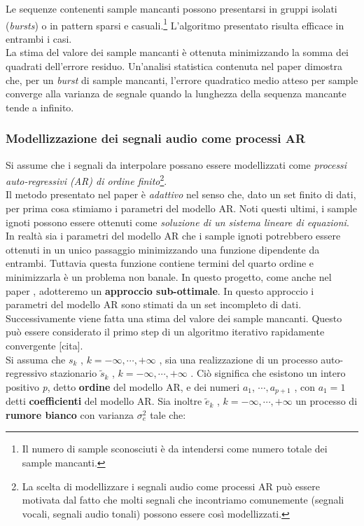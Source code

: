 \documentclass{article}
\begin{document}
Le sequenze contenenti sample mancanti possono presentarsi in gruppi isolati (\textit{bursts}) o in pattern sparsi e casuali.\footnote{Il numero di sample sconosciuti è da intendersi come numero totale dei sample mancanti. } 
L'algoritmo presentato risulta efficace in entrambi i casi.
\medskip 
\\
La stima del valore dei sample mancanti è ottenuta minimizzando la somma dei quadrati dell'errore residuo. 
Un'analisi statistica contenuta nel paper \cite[Section II.B]{paper_1986} dimostra che, per un \textit{burst} di sample mancanti, l'errore quadratico medio atteso per sample converge alla varianza de segnale quando la lunghezza della sequenza mancante tende a infinito. 
\subsubsection{Modellizzazione dei segnali audio come processi AR}  
Si assume che i segnali da interpolare possano essere modellizzati come \emph{processi auto-regressivi (AR) di ordine finito}\footnote{La scelta di modellizzare i segnali audio come processi AR può essere motivata dal fatto che molti segnali che incontriamo comunemente (segnali vocali, segnali audio tonali) possono essere così modellizzati.}.
\\
Il metodo presentato nel paper \cite{paper_1986} è \emph{adattivo} nel senso che, dato un set finito di dati, per prima cosa stimiamo i parametri del modello AR. Noti questi ultimi, i sample ignoti possono essere ottenuti come \textit{soluzione di un sistema lineare di equazioni}.
\\
In realtà sia i parametri del modello AR che i sample ignoti potrebbero essere ottenuti in un unico passaggio minimizzando una funzione dipendente da entrambi. Tuttavia questa funzione contiene termini del quarto ordine e minimizzarla è un problema non banale. In questo progetto, come anche nel paper \cite{paper_1986}, adotteremo un \textbf{approccio sub-ottimale}. In questo approccio i parametri del modello AR sono stimati da un set incompleto di dati. Successivamente viene fatta una stima del valore dei sample mancanti. Questo può essere considerato il primo step di un algoritmo iterativo rapidamente convergente [cita].
\medskip 
\\
Si assuma che $s_{k}$ , $k =  -\infty , \cdots , +\infty$ , sia una realizzazione di un processo auto-regressivo stazionario $\tilde{s}_{k}$ , $k =  -\infty , \cdots , +\infty$ . Ciò significa che esistono un intero positivo \emph{p}, detto \textbf{ordine} del modello AR, e dei numeri $a_{1}$, $\cdots , a_{p+1}$ , con $a_{1}=1$ detti \textbf{coefficienti} del modello AR. Sia inoltre $\tilde{e}_{k}$ , $k =  -\infty , \cdots , +\infty$ un processo di \textbf{rumore bianco} con varianza $\sigma_{e}^{2}$ tale che: 
\end{document}
